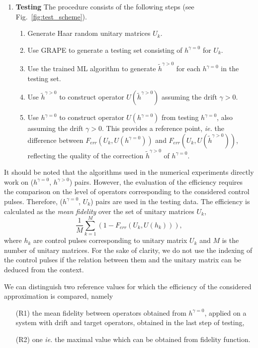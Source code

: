 \documentclass[aps,pra,showkeys,showpacs,notitlepage,superscriptaddress]{revtex4-1}
\newcommand{\1}{{\rm 1\hspace{-0.9mm}l}}
\newcommand{\ie}{\emph{ie.}\xspace}
\newcommand{\NCP}{\ensuremath{h^{\gamma=0}}\xspace}
\newcommand{\DCP}{\ensuremath{h^{\gamma >0}}\xspace}
\newcommand{\nnDCP}{\ensuremath{\tilde{h}^{\gamma >0}}\xspace}
\begin{document}
\begin{enumerate}
\begin{enumerate}
  \end{enumerate}
  
  
  \item \textbf{Testing}
  The procedure consists of the following steps (see Fig.~\ref{fig:test_scheme}). 
  \begin{enumerate}
    \item Generate Haar random unitary matrices $U_{k}$.
    
    \item Use GRAPE to generate a testing set consisting of \NCP for $U_{k}$.
    
    \item Use the trained ML algorithm to generate $\nnDCP$ for each \NCP in the testing set.
    
    \item Use $\nnDCP$ to construct operator $U(\nnDCP)$ assuming the drift $\gamma>0$.
    
    \item Use $\NCP$ to construct operator $U(\NCP)$ from testing \NCP, also
    assuming the drift $\gamma>0$. This provides a reference point, \ie the difference between $F_{err}(U_k,U(\NCP))$ and $F_{err}(U_k,U(\nnDCP))$, reflecting the quality of the correction \nnDCP of \NCP.

  \end{enumerate}
\end{enumerate}


It should be noted that the algorithms used in the numerical experiments directly work on (\NCP, \DCP) pairs. However, the evaluation of the efficiency requires the comparison on the level of operators corresponding to the considered control pulses. Therefore, (\NCP, $U_{k}$) pairs are used in the testing data. The efficiency is calculated as the \emph{mean fidelity} over the set of unitary matrices $U_k$,
\begin{equation}
\frac{1}{M}\sum_{k=1}^M (1- F_{err}(U_k, U(h_k))),
\end{equation}
where $h_k$  are control pulses corresponding to unitary matrix $U_k$ and $M$ is the number of unitary matrices. For the sake of clarity, we do not use the indexing of the control pulses if the relation between them and the unitary matrix can be deduced from the context.


We can distinguish two reference values for which the efficiency of the considered approximation is compared, namely 

\begin{itemize}
    \item[(R1)] the mean fidelity between operators obtained from \NCP, applied on a system with drift and target operators, obtained in the last step of testing,
    \item[(R2)] one \ie the maximal value which can be obtained from fidelity function.
\end{itemize}
\end{document}
